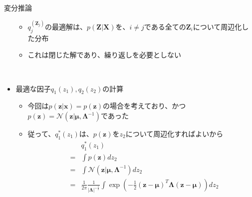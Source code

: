 \documentclass[dvipdfmx,notheorems,t]{beamer}
\begin{document}
\begin{frame}{変分推論}
\begin{itemize}
\begin{itemize}
		\item $q_j^(\bm{Z}_j)$の最適解は、$p(\bm{Z} | \bm{X})$を、$i \neq j$である全ての$\bm{Z}_i$について周辺化した分布
		\item これは閉じた解であり、繰り返しを必要としない
	\end{itemize} \
	
	\item 最適な因子$q_1(z_1), q_2(z_2)$の計算
	\begin{itemize}
		\item 今回は$p(\bm{z} | \bm{x}) = p(\bm{z})$の場合を考えており、かつ$p(\bm{z}) = \mathcal{N}(\bm{z} | \bm{\mu}, \bm{\Lambda}^{-1})$であった
		\newline
		
		\item 従って、$q_1^*(z_1)$は、$p(\bm{z})$を$z_2$について周辺化すればよいから
		\begin{eqnarray}
			&& q_1^*(z_1) \nonumber \\
			&=& \int p(\bm{z}) dz_2 \nonumber \\
			&=& \int \mathcal{N}(\bm{z} | \bm{\mu}, \bm{\Lambda}^{-1}) dz_2 \\
			&=& \frac{1}{2\pi} \frac{1}{|\bm{\Lambda}|^{-\frac{1}{2}}} \int \exp \left( -\frac{1}{2} (\bm{z} - \bm{\mu})^T \bm{\Lambda} (\bm{z} - \bm{\mu}) \right) dz_2
		\end{eqnarray}
		

\end{itemize}
\end{itemize}
\end{frame}
\end{document}
